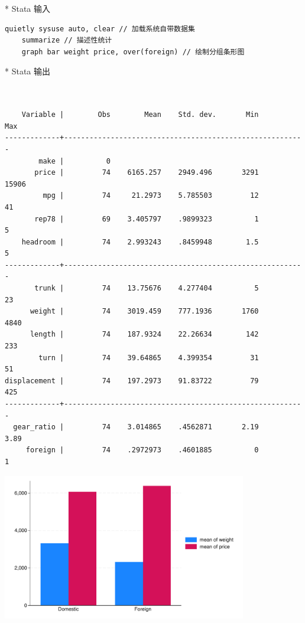 \begin{tcolorbox}[title=Stata 示例, colback=white, colframe=black, colbacktitle=white, coltitle=black,fonttitle=\bfseries]
 * Stata 输入
	\begin{lstlisting}[xleftmargin=2em]
	quietly sysuse auto, clear // 加载系统自带数据集
	summarize // 描述性统计
	graph bar weight price, over(foreign) // 绘制分组条形图
	\end{lstlisting}
 * Stata 输出
	\vspace{-2em}
	\begin{Verbatim}[commandchars=\\\{\},xleftmargin=2em]

		
    Variable |        Obs        Mean    Std. dev.       Min        Max
-------------+---------------------------------------------------------
        make |          0
       price |         74    6165.257    2949.496       3291      15906
         mpg |         74     21.2973    5.785503         12         41
       rep78 |         69    3.405797    .9899323          1          5
    headroom |         74    2.993243    .8459948        1.5          5
-------------+---------------------------------------------------------
       trunk |         74    13.75676    4.277404          5         23
      weight |         74    3019.459    777.1936       1760       4840
      length |         74    187.9324    22.26634        142        233
        turn |         74    39.64865    4.399354         31         51
displacement |         74    197.2973    91.83722         79        425
-------------+---------------------------------------------------------
  gear_ratio |         74    3.014865    .4562871       2.19       3.89
     foreign |         74    .2972973    .4601885          0          1
	\end{Verbatim}

	\begin{center}
	\includegraphics[width=0.8\textwidth]{image/autobar.pdf}
	\end{center}

\end{tcolorbox}

